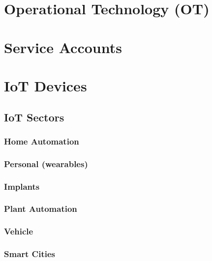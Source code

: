 \hypertarget{operational-technology-ot}{%
\section{Operational Technology
(OT)}\label{operational-technology-ot}}

\hypertarget{service-accounts}{%
\section{Service Accounts}\label{service-accounts}}

\hypertarget{iot-devices}{%
\section{IoT Devices}\label{iot-devices}}

\hypertarget{iot-sectors}{%
\subsection{IoT Sectors}\label{iot-sectors}}

\hypertarget{home-automation}{%
\subsubsection{Home Automation}\label{home-automation}}

\hypertarget{personal-wearables}{%
\subsubsection{Personal (wearables)}\label{personal-wearables}}

\hypertarget{implants}{%
\subsubsection{Implants}\label{implants}}

\hypertarget{plant-automation}{%
\subsubsection{Plant Automation}\label{plant-automation}}

\hypertarget{vehicle}{%
\subsubsection{Vehicle}\label{vehicle}}

\hypertarget{smart-cities}{%
\subsubsection{Smart Cities}\label{smart-cities}}

